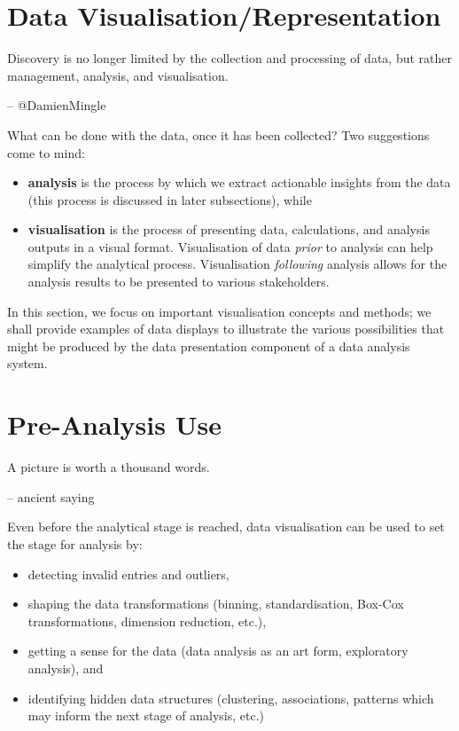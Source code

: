 \section{Data Visualisation/Representation}
\label{sec:DV}
\begin{tcolorbox}[title=Analysis in the Modern Age]
Discovery is no longer limited by the collection and processing of data, but rather management, analysis, and visualisation. \\[-0.6cm]
\begin{flushright}
-- @DamienMingle
\end{flushright}
\end{tcolorbox}
\noindent What can be done with the data, once it has been collected? Two suggestions come to mind: 
\begin{itemize}[noitemsep,topsep=2pt]
\item \textbf{analysis} is the process by which we extract actionable insights from the data (this process is discussed in later subsections), while
\item \textbf{visualisation} is the process of presenting data, calculations, and analysis outputs in a visual format. Visualisation of data \textit{prior} to analysis can help simplify the analytical process. Visualisation \textit{following} analysis allows for the analysis results to be presented to various stakeholders.  
\end{itemize}
\vspace{3pt}
In this section, we focus on important visualisation concepts and methods; we shall provide examples of data displays to illustrate the various possibilities that might be produced by the data presentation component of a data analysis system.   
\section{Pre-Analysis Use}
\begin{tcolorbox}[title=The Ying.. ]
A picture is worth a thousand words.\\[-0.6cm]
\begin{flushright}
-- ancient saying
\end{flushright}
\end{tcolorbox}\noindent Even before the analytical stage is reached, data visualisation can be used to set the stage for analysis by:
\begin{itemize}[noitemsep,topsep=2pt]
\item detecting invalid entries and outliers,
\item shaping the data transformations (binning, standardisation, Box-Cox transformations, dimension reduction, etc.),
\item getting a sense for the data (data analysis as an art form, exploratory analysis), and 
\item identifying hidden data structures (clustering, associations, patterns which may inform the next stage of analysis, etc.)
\end{itemize}
